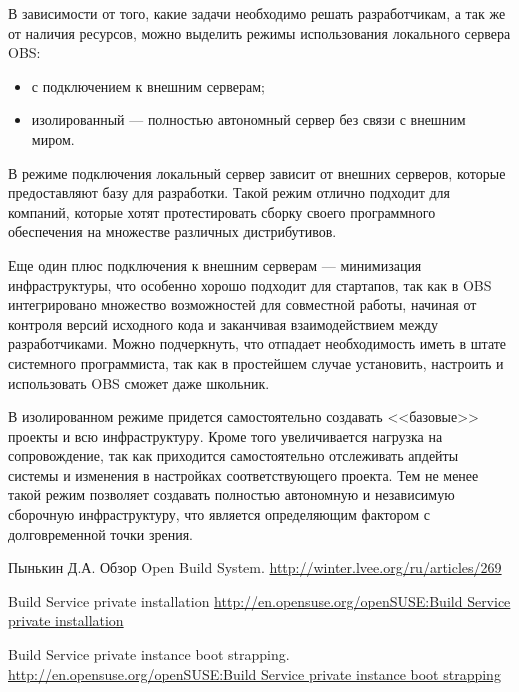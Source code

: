 \documentclass[10pt, a5paper]{article}
\begin{document}
В зависимости от того, какие задачи необходимо решать разработчикам, а так же от наличия ресурсов, можно выделить режимы использования локального сервера OBS:

\begin{itemize}
	\item с подключением к внешним серверам;
	\item изолированный --- полностью автономный сервер без связи с внешним миром.
\end{itemize}

В режиме подключения локальный сервер зависит от внешних серверов, которые предоставляют базу для разработки. Такой режим отлично подходит для компаний, которые хотят протестировать сборку своего программного обеспечения на множестве различных дистрибутивов.

Еще один плюс подключения к внешним серверам --- минимизация инфраструктуры, что особенно хорошо подходит для стартапов, так как в OBS интегрировано множество возможностей для совместной работы, начиная от контроля версий исходного кода и заканчивая взаимодействием между разработчиками. Можно подчеркнуть, что отпадает необходимость иметь в штате системного программиста, так как в простейшем случае установить, настроить и использовать OBS сможет даже школьник.

В изолированном режиме придется самостоятельно создавать <<базовые>> проекты \cite{Pynkin3} и всю инфраструктуру. Кроме того увеличивается нагрузка на сопровождение, так как приходится самостоятельно отслеживать апдейты системы и изменения в настройках соответствующего проекта. Тем не менее такой режим позволяет создавать полностью автономную и независимую сборочную инфраструктуру, что является определяющим фактором с долговременной точки зрения.

\begin{thebibliography}{9}

 Пынькин Д.А. Обзор Open Build System.
\url{http://winter.lvee.org/ru/articles/269}


 Build Service private installation \url{http://en.opensuse.org/openSUSE:Build Service private installation}

 Build Service private instance boot strapping.
\url{http://en.opensuse.org/openSUSE:Build Service private instance boot strapping}

\end{thebibliography}
\end{document}
